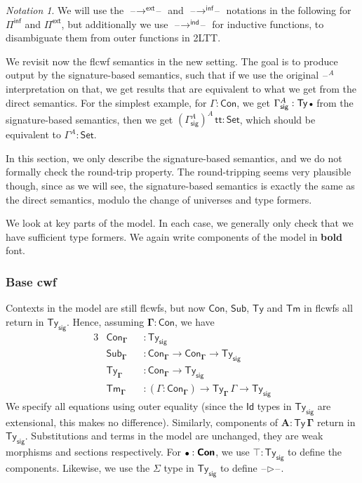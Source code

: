 \documentclass[12pt,a4paper,twoside,openany]{book}
\theoremstyle{remark}
\newtheorem{notation}{Notation}
\theoremstyle{definition}
\theoremstyle{theorem}
\newcommand{\ms}[1]{\mathsf{#1}}
\newcommand{\bs}[1]{\boldsymbol{#1}}
\newcommand{\toind}{\to^{\ms{ind}}}
\newcommand{\Tys}{\ms{Ty_{sig}}}
\newcommand{\Con}{\mathsf{Con}}
\newcommand{\Sub}{\mathsf{Sub}}
\newcommand{\Tm}{\mathsf{Tm}}
\newcommand{\Ty}{\mathsf{Ty}}
\newcommand{\Id}{\mathsf{Id}}
\renewcommand{\tt}{\mathsf{tt}}
\newcommand{\blank}{\mathord{\hspace{1pt}\text{--}\hspace{1pt}}}
\newcommand{\Set}{\mathsf{Set}}
\newcommand{\ext}{\triangleright}
\newcommand{\emptycon}{\scaleobj{.75}\bullet}
\newcommand{\Pie}{\Pi^{\mathsf{ext}}}
\newcommand{\toe}{\to^{\ms{ext}}}
\newcommand{\Piinf}{\Pi^{\mathsf{inf}}}
\newcommand{\toinf}{\to^{\ms{inf}}}
\newcommand{\bCon}{\bs{\Con}}
\newcommand{\bTy}{\bs{\Ty}}
\newcommand{\bGamma}{\bs{\Gamma}}
\newcommand{\bA}{\bs{A}}
\newcommand{\bemptycon}{\scaleobj{.75}{\bs{\bullet}}}
\begin{document}
\begin{notation}
We will use the $\blank\!\toe\!\blank$ and $\blank\!\toinf\!\blank$ notations
in the following for $\Piinf$ and $\Pie$, but additionally we use $\blank\!\toind\!\blank$
for inductive functions, to disambiguate them from outer functions in 2LTT.
\end{notation}

We revisit now the flcwf semantics in the new setting. The goal is to produce
output by the signature-based semantics, such that if we use the original
$\blank^A$ interpretation on that, we get results that are equivalent to what we
get from the direct semantics. For the simplest example, for $\Gamma : \Con$, we
get $\Gamma^A_{\ms{sig}} : \Ty\,\emptycon$ from the signature-based semantics,
then we get $(\Gamma^A_{\ms{sig}})^A\,\tt : \Set$, which should be equivalent to
$\Gamma^A : \Set$.

In this section, we only describe the signature-based semantics, and we do not
formally check the round-trip property. The round-tripping seems very plausible
though, since as we will see, the signature-based semantics is exactly the same
as the direct semantics, modulo the change of universes and type formers.

We look at key parts of the model. In each case, we generally only check that we
have sufficient type formers. We again write components of the model in
\textbf{bold} font.

\subsubsection{Base cwf}
Contexts in the model are still flcwfs, but now $\Con$, $\Sub$, $\Ty$ and $\Tm$ in
flcwfs all return in $\Tys$. Hence, assuming $\bGamma : \bCon$, we have
\begin{alignat*}{3}
  &\Con_{\bGamma} &&: \Tys \\
  &\Sub_{\bGamma} &&: \Con_{\bGamma} \to \Con_{\bGamma} \to \Tys \\
  &\Ty_{\bGamma}  &&: \Con_{\bGamma} \to \Tys \\
  &\Tm_{\bGamma}  &&: (\Gamma : \Con_{\bGamma}) \to \Ty_{\bGamma}\,\Gamma \to \Tys
\end{alignat*}
We specify all equations using outer equality (since the $\Id$ types in $\Tys$
are extensional, this makes no difference). Similarly, components of $\bA :
\bTy\,\bGamma$ return in $\Tys$. Substitutions and terms in the model are
unchanged, they are weak morphisms and sections respectively. For $\bemptycon :
\bCon$, we use $\top : \Tys$ to define the components. Likewise, we use
the $\Sigma$ type in $\Tys$ to define $\blank\bs{\ext}\blank$.
\end{document}
